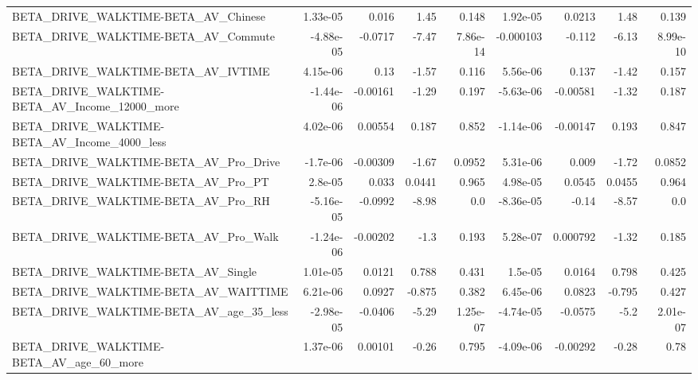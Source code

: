 \begin{tabular}{lrrrrrrrr}
BETA\_DRIVE\_WALKTIME-BETA\_AV\_Chinese                &    1.33e-05 &        0.016 &      1.45 &    0.148 &   1.92e-05 &      0.0213 &         1.48 &         0.139 \\
BETA\_DRIVE\_WALKTIME-BETA\_AV\_Commute                &   -4.88e-05 &      -0.0717 &     -7.47 & 7.86e-14 &  -0.000103 &      -0.112 &        -6.13 &      8.99e-10 \\
BETA\_DRIVE\_WALKTIME-BETA\_AV\_IVTIME                 &    4.15e-06 &         0.13 &     -1.57 &    0.116 &   5.56e-06 &       0.137 &        -1.42 &         0.157 \\
BETA\_DRIVE\_WALKTIME-BETA\_AV\_Income\_12000\_more      &   -1.44e-06 &     -0.00161 &     -1.29 &    0.197 &  -5.63e-06 &    -0.00581 &        -1.32 &         0.187 \\
BETA\_DRIVE\_WALKTIME-BETA\_AV\_Income\_4000\_less       &    4.02e-06 &      0.00554 &     0.187 &    0.852 &  -1.14e-06 &    -0.00147 &        0.193 &         0.847 \\
BETA\_DRIVE\_WALKTIME-BETA\_AV\_Pro\_Drive              &    -1.7e-06 &     -0.00309 &     -1.67 &   0.0952 &   5.31e-06 &       0.009 &        -1.72 &        0.0852 \\
BETA\_DRIVE\_WALKTIME-BETA\_AV\_Pro\_PT                 &     2.8e-05 &        0.033 &    0.0441 &    0.965 &   4.98e-05 &      0.0545 &       0.0455 &         0.964 \\
BETA\_DRIVE\_WALKTIME-BETA\_AV\_Pro\_RH                 &   -5.16e-05 &      -0.0992 &     -8.98 &      0.0 &  -8.36e-05 &       -0.14 &        -8.57 &           0.0 \\
BETA\_DRIVE\_WALKTIME-BETA\_AV\_Pro\_Walk               &   -1.24e-06 &     -0.00202 &      -1.3 &    0.193 &   5.28e-07 &    0.000792 &        -1.32 &         0.185 \\
BETA\_DRIVE\_WALKTIME-BETA\_AV\_Single                 &    1.01e-05 &       0.0121 &     0.788 &    0.431 &    1.5e-05 &      0.0164 &        0.798 &         0.425 \\
BETA\_DRIVE\_WALKTIME-BETA\_AV\_WAITTIME               &    6.21e-06 &       0.0927 &    -0.875 &    0.382 &   6.45e-06 &      0.0823 &       -0.795 &         0.427 \\
BETA\_DRIVE\_WALKTIME-BETA\_AV\_age\_35\_less            &   -2.98e-05 &      -0.0406 &     -5.29 & 1.25e-07 &  -4.74e-05 &     -0.0575 &         -5.2 &      2.01e-07 \\
BETA\_DRIVE\_WALKTIME-BETA\_AV\_age\_60\_more            &    1.37e-06 &      0.00101 &     -0.26 &    0.795 &  -4.09e-06 &    -0.00292 &        -0.28 &          0.78 \\

\end{tabular}
